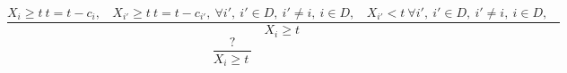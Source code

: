 $$\frac{X_{i} \geq t~t=t-c_{i},~~~~X_{i'} \geq t~t=t-c_{i'},~ \forall i',~i' \in D,~i' \neq i,~i \in D,~~~~X_{i'}<t~ \forall i',~i' \in D,~i' \neq i,~i \in D,~~~~}{X_{i} \geq t~}$$ $$\frac{? }{X_{i} \geq t~}$$ 